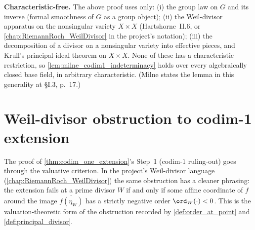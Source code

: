 \begin{remark}
  \label{rmk:milne_lem33_charfree}
  \textbf{Characteristic-free.} The above proof uses only: (i) the group law on \(G\)
  and its inverse (formal smoothness of \(G\) as a group object); (ii) the Weil-divisor
  apparatus on the nonsingular variety \(X \times X\) (Hartshorne~II.6, or
  \cref{chap:RiemannRoch_WeilDivisor} in the project's notation); (iii) the
  decomposition of a divisor on a nonsingular variety into effective pieces, and
  Krull's principal-ideal theorem on \(X \times X\). None of these has a characteristic
  restriction, so \cref{lem:milne_codim1_indeterminacy} holds over every
  algebraically closed base field, in arbitrary characteristic. (Milne states the
  lemma in this generality at \S I.3, p.~17.)
\end{remark}

\section{Weil-divisor obstruction to codim-1 extension}
\label{sec:weil_obstruction}

The proof of \cref{thm:codim_one_extension}'s Step~1 (codim-\(1\) ruling-out) goes
through the valuative criterion. In the project's Weil-divisor language
(\cref{chap:RiemannRoch_WeilDivisor}) the same obstruction has a cleaner phrasing:
the extension fails at a prime divisor \(W\) if and only if some affine coordinate of
\(f\) around the image \(\overline{f(\eta_W)}\) has a strictly negative order
\(\ord_W(\cdot) < 0\). This is the valuation-theoretic form of the obstruction
recorded by \cref{def:order_at_point} and \cref{def:principal_divisor}.

